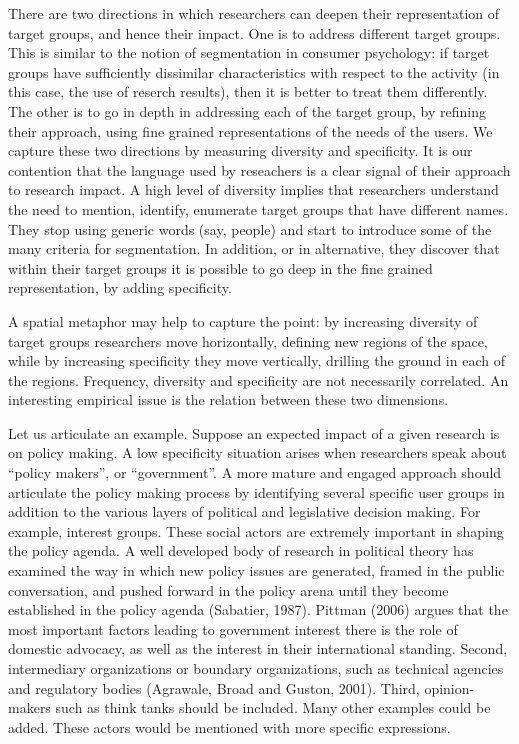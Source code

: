 \documentclass[]{book}
\begin{document}
There are two directions in which researchers can deepen their
representation of target groups, and hence their impact. One is to
address different target groups. This is similar to the notion of
segmentation in consumer psychology: if target groups have sufficiently
dissimilar characteristics with respect to the activity (in this case,
the use of reserch results), then it is better to treat them
differently. The other is to go in depth in addressing each of the
target group, by refining their approach, using fine grained
representations of the needs of the users. We capture these two
directions by measuring diversity and specificity. It is our contention
that the language used by reseachers is a clear signal of their approach
to research impact. A high level of diversity implies that researchers
understand the need to mention, identify, enumerate target groups that
have different names. They stop using generic words (say, people) and
start to introduce some of the many criteria for segmentation. In
addition, or in alternative, they discover that within their target
groups it is possible to go deep in the fine grained representation, by
adding specificity.

A spatial metaphor may help to capture the point: by increasing
diversity of target groups researchers move horizontally, defining new
regions of the space, while by increasing specificity they move
vertically, drilling the ground in each of the regions. Frequency,
diversity and specificity are not necessarily correlated. An interesting
empirical issue is the relation between these two dimensions.

Let us articulate an example. Suppose an expected impact of a given
research is on policy making. A low specificity situation arises when
researchers speak about ``policy makers'', or ``government''. A more
mature and engaged approach should articulate the policy making process
by identifying several specific user groups in addition to the various
layers of political and legislative decision making. For example,
interest groups. These social actors are extremely important in shaping
the policy agenda. A well developed body of research in political theory
has examined the way in which new policy issues are generated, framed in
the public conversation, and pushed forward in the policy arena until
they become established in the policy agenda (Sabatier, 1987). Pittman
(2006) argues that the most important factors leading to government
interest there is the role of domestic advocacy, as well as the interest
in their international standing. Second, intermediary organizations or
boundary organizations, such as technical agencies and regulatory bodies
(Agrawale, Broad and Guston, 2001). Third, opinion-makers such as think
tanks should be included. Many other examples could be added. These
actors would be mentioned with more specific expressions.
\end{document}

